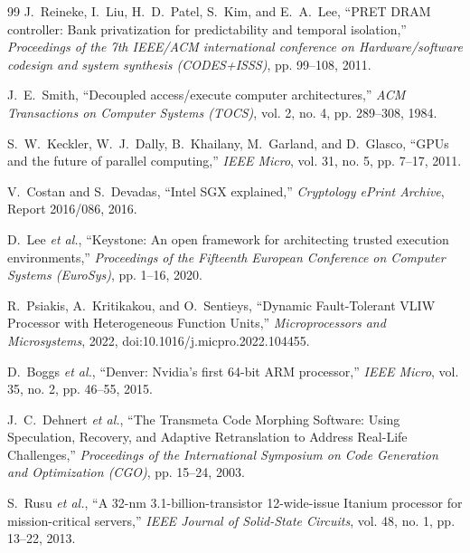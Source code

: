 \documentclass[twocolumn]{article}
\begin{document}
\begin{thebibliography}{99}
J.~Reineke, I.~Liu, H.~D.~Patel, S.~Kim, and E.~A.~Lee,
``PRET DRAM controller: Bank privatization for predictability and temporal isolation,''
\emph{Proceedings of the 7th IEEE/ACM international conference on Hardware/software codesign and system synthesis (CODES+ISSS)}, pp. 99--108, 2011.

J.~E.~Smith,
``Decoupled access/execute computer architectures,''
\emph{ACM Transactions on Computer Systems (TOCS)}, vol. 2, no. 4, pp. 289--308, 1984.

S.~W.~Keckler, W.~J.~Dally, B.~Khailany, M.~Garland, and D.~Glasco,
``GPUs and the future of parallel computing,''
\emph{IEEE Micro}, vol. 31, no. 5, pp. 7--17, 2011.

V.~Costan and S.~Devadas,
``Intel SGX explained,''
\emph{Cryptology ePrint Archive}, Report 2016/086, 2016.

D.~Lee \emph{et al.},
``Keystone: An open framework for architecting trusted execution environments,''
\emph{Proceedings of the Fifteenth European Conference on Computer Systems (EuroSys)}, pp. 1--16, 2020.

R.~Psiakis, A.~Kritikakou, and O.~Sentieys,
``Dynamic Fault-Tolerant VLIW Processor with Heterogeneous Function Units,''
\emph{Microprocessors and Microsystems}, 2022, doi:10.1016/j.micpro.2022.104455.

D.~Boggs \emph{et al.},
``Denver: Nvidia's first 64-bit ARM processor,''
\emph{IEEE Micro}, vol. 35, no. 2, pp. 46--55, 2015.

J.~C.~Dehnert \emph{et al.},
``The Transmeta Code Morphing Software: Using Speculation, Recovery, and Adaptive Retranslation to Address Real-Life Challenges,''
\emph{Proceedings of the International Symposium on Code Generation and Optimization (CGO)}, pp. 15--24, 2003.

S.~Rusu \emph{et al.},
``A 32-nm 3.1-billion-transistor 12-wide-issue Itanium processor for mission-critical servers,''
\emph{IEEE Journal of Solid-State Circuits}, vol. 48, no. 1, pp. 13--22, 2013.


\end{thebibliography}
\end{document}
